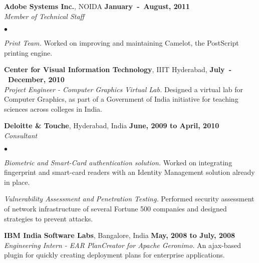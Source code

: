 \documentclass[margin,line]{res}
\newenvironment{list2}{
  \begin{list}{$\bullet$}{%
      \setlength{\itemsep}{0in}
      \setlength{\parsep}{0in} \setlength{\parskip}{0in}
      \setlength{\topsep}{0in} \setlength{\partopsep}{0in} 
      \setlength{\leftmargin}{0.2in}}}{\end{list}}
\begin{document}
\begin{resume}
{\bf Adobe Systems Inc.}, NOIDA \hfill {\bf January~-~August, 2011}\\
{\em Member of Technical Staff}\par
\begin{list2}
\item {\em Print Team.} Worked on improving and maintaining Camelot, the PostScript printing engine.
\end{list2}

{\bf Center for Visual Information Technology}, IIIT Hyderabad, \hfill {\bf July~-~December, 2010}\\
{\em Project Engineer - Computer Graphics Virtual Lab.} Designed a virtual lab for Computer Graphics, as part of a Government of India initiative for teaching sciences across colleges in India.

{\bf Deloitte \& Touche}, Hyderabad, India \hfill {\bf June, 2009 to April, 2010}\\
{\em Consultant}\par
\begin{list2}
\item {\em Biometric and Smart-Card authentication solution.} Worked on integrating fingerprint
and smart-card readers with an Identity Management solution already in place.
\item {\em Vulnerability Assessment and Penetration Testing.} Performed security assessment
of network infrastructure of several Fortune 500 companies and designed strategies to prevent attacks.
\end{list2}

{\bf IBM India Software Labs}, Bangalore, India \hfill {\bf May, 2008 to July, 2008}\\
{\em Engineering Intern - EAR PlanCreator for Apache Geronimo.} An ajax-based plugin for quickly creating deployment plans for enterprise applications.


\end{resume}
\end{document}
